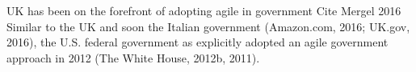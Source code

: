 
UK has been on the forefront of adopting agile in government 
Cite Mergel 2016
Similar to the UK and soon the Italian government (Amazon.com, 2016; UK.gov, 2016), the U.S. federal government as explicitly adopted an agile government approach in 2012 (The White House, 2012b, 2011). 





